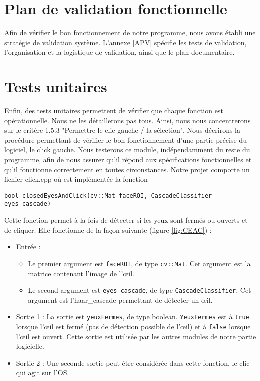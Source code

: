 \section{Plan de validation fonctionnelle}

Afin de vérifier le bon fonctionnement de notre programme, nous avons établi une stratégie de validation système. L'annexe \ref{APV} spécifie les tests de validation, l'organisation et la logistique de validation, ainsi que le plan documentaire. 

\section{Tests unitaires}

Enfin, des tests unitaires permettent de vérifier que chaque fonction est opérationnelle. Nous ne les détaillerons pas tous. Ainsi, nous nous concentrerons sur le critère 1.5.3 "Permettre le clic gauche / la sélection". Nous décrirons la procédure permettant de vérifier le bon fonctionnement d’une partie précise du logiciel, le click gauche. Nous testerons ce module, indépendamment du reste du programme, afin de nous assurer qu’il répond aux spécifications fonctionnelles et qu’il fonctionne correctement en toutes circonstances.
Notre projet comporte un fichier click.cpp où est implémentée la fonction
\begin{lstlisting}
bool closedEyesAndClick(cv::Mat faceROI, CascadeClassifier eyes_cascade)
\end{lstlisting}

Cette fonction permet à la fois de détecter si les yeux sont fermés ou ouverts et de cliquer. Elle fonctionne de la façon suivante (figure \ref{fig:CEAC}) :
\begin{itemize}[font=\tiny, label=]
\item Entrée :
\begin{itemize}[font=\tiny, label=]
\item Le premier argument est \lstinline=faceROI=, de type \lstinline=cv::Mat=. Cet argument est la matrice contenant l’image de l’œil.
\item Le second argument est \lstinline=eyes_cascade=, de type \lstinline=CascadeClassifier=. Cet argument est l’haar\_cascade permettant de détecter un œil.
\end{itemize}
\item  Sortie 1 : La sortie est \lstinline=yeuxFermes=, de type boolean. \lstinline=YeuxFermes= est à \lstinline=true= lorsque l’œil est fermé (pas de détection possible de l’œil) et à \lstinline=false= lorsque l’œil est ouvert. Cette sortie est utilisée par les autres modules de notre partie logicielle.
\item Sortie 2 : Une seconde sortie peut être considérée dans cette fonction, le clic qui agit sur l’OS.
\end{itemize}


